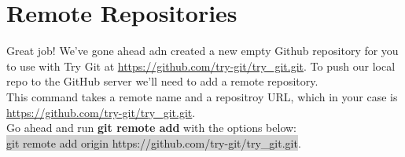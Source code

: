 \documentclass{article}
\begin{document}
\section{Remote Repositories}
\begin{minipage}[c]{0.66\textwidth}
	\parbox{\textwidth}{
		Great job! We've gone ahead adn created a new empty Github repository for you to use with Try Git at \href{https://github.com/try-git/try\_git.git}{https://github.com/try-git/try\_git.git}. To push our local repo to the GitHub server we'll need to add a remote repository.\\
		This command takes a remote name and a repositroy URL, which in your case is \href{https://github.com/try-git/try\_git.git}{https://github.com/try-git/try\_git.git}.\\
		Go ahead and run \textbf{git remote add} with the options below:\\
		\colorbox{lightgray}{git remote add  origin https://github.com/try-git/try\_git.git}.\\
	}
\end{minipage}
\hfill
\begin{minipage}[c]{0.32\textwidth}
\end{minipage}
\end{document}
